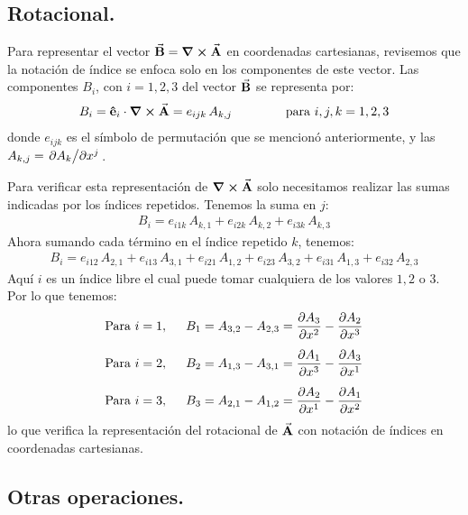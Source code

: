 \documentclass[hidelinks,12pt]{article}
\begin{document}
\subsection{Rotacional.}

Para representar el vector $\va{B} = \curl{\va{A}}$ en coordenadas cartesianas, revisemos que la notación de índice se enfoca solo en los componentes de este vector. Las componentes $B_{i}$, con $i =1, 2, 3$ del vector $\va{B}$ se representa por:
\begin{align*}
B_{i} = \vu{e}_{i} \cdot \curl{\va{A}} = e_{ijk} \, A_{k,j} \hspace{1.5cm} \text{para } i, j, k = 1, 2, 3
\end{align*}
donde $e_{ijk}$ es el símbolo de permutación que se mencionó anteriormente, y las $A_{k,j} = \pdv*{A_{k}}{x^{j}}$.
\par
Para verificar esta representación de $\curl{\va{A}}$ solo necesitamos realizar las sumas indicadas por los índices repetidos. Tenemos la suma en $j$:
\begin{align*}
B_{i} = e_{i1k} \, A_{k,1} + e_{i2k} \, A_{k,2} + e_{i3k} \, A_{k,3}
\end{align*}
Ahora sumando cada término en el índice repetido $k$, tenemos:
\begin{align*}
B_{i} = e_{i12} \, A_{2,1} + e_{i13} \, A_{3,1} + e_{i21} \, A_{1,2} + e_{i23} \, A_{3,2} + e_{i31} \, A_{1,3} + e_{i32} \, A_{2,3}
\end{align*}
Aquí $i$ es un índice libre el cual puede tomar cualquiera de los valores $1, 2$ o $3$. Por lo que tenemos:
\begin{align*}
&\text{Para } i = 1, \hspace{0.5cm} B_{1} = A_{3, 2} - A_{2, 3} = \pdv{A_{3}}{x^{2}} - \pdv{A_{2}}{x^{3}} \\[0.5em]
&\text{Para } i = 2, \hspace{0.5cm} B_{2} = A_{1, 3} - A_{3, 1} = \pdv{A_{1}}{x^{3}} - \pdv{A_{3}}{x^{1}} \\[0.5em]
&\text{Para } i = 3, \hspace{0.5cm} B_{3} = A_{2, 1} - A_{1, 2} = \pdv{A_{2}}{x^{1}} - \pdv{A_{1}}{x^{2}}
\end{align*}
lo que verifica la representación del rotacional de $\va{A}$ con notación de índices en coordenadas cartesianas.

\subsection{Otras operaciones.}
\end{document}
